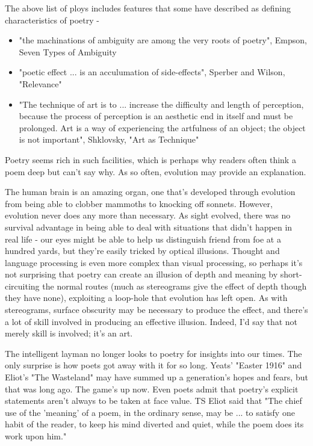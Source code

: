 \documentclass[11pt]{article}
\begin{document}
The above list of ploys includes features that some have described as defining characteristics of poetry  - 
\begin{itemize}
\item "the machinations of ambiguity are among the very roots of poetry", 
Empson, Seven Types of Ambiguity
\item "poetic effect ... is an acculumation of side-effects", Sperber and Wilson,
"Relevance" 
\item "The technique of art 
is to ... increase the difficulty and
length of perception, because the process of perception
is an aesthetic end in itself and must be prolonged. Art is a way of
experiencing the artfulness of an object; the object is not important", 
Shklovsky, "Art as Technique"
\end{itemize}

 Poetry seems rich in such facilities, which is perhaps why readers often think a poem deep but can't say why. As so often, evolution may provide an explanation.
 

The human brain is an amazing organ, one that's developed through evolution from being able to clobber mammoths to knocking off sonnets.  However, evolution never does any more than necessary. As sight evolved, there was no survival advantage in being able to deal with situations that didn't happen in real life - our eyes might be able to help us distinguish friend from foe at a hundred yards, but they're easily tricked by optical illusions. Thought and language processing is even more complex than visual processing, so perhaps it's not surprising that poetry can create an illusion of depth and meaning by short-circuiting the normal routes (much as stereograms give the effect of depth though they have none), exploiting a loop-hole that evolution has left open. As with stereograms, surface obscurity may be necessary to produce the effect, and there's a lot of skill involved in producing an effective illusion. Indeed, I'd say that not merely skill is involved; it's an art. 
 

The intelligent layman no longer looks to poetry for insights into our times. The only surprise is how poets got away with it for so long. Yeats' "Easter 1916" and Eliot's "The Wasteland" may have summed up a generation's hopes and fears, 
but that was long ago. The game's up now. Even poets admit that poetry's explicit statements aren't always to be taken at face value. TS Eliot said that "The chief use of the 'meaning' of a poem, in the ordinary sense, may be ... to satisfy one habit of the reader, to keep his mind diverted and quiet, while the poem does its work upon him."
\end{document}
